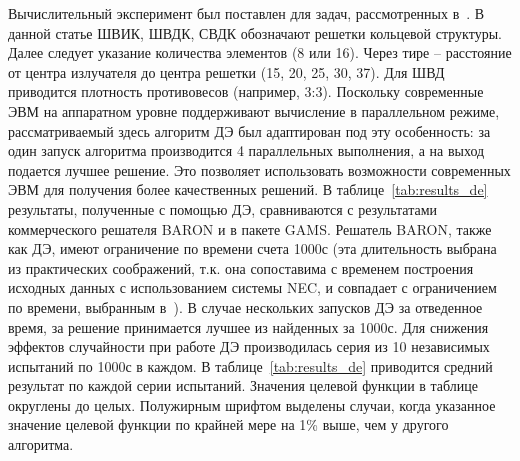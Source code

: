 \documentclass{llncs}
\begin{document}
Вычислительный эксперимент был поставлен для задач, рассмотренных в~\cite{tyunin:daor,tyunin:oniip}. В данной статье ШВИК, ШВДК, СВДК обозначают решетки кольцевой структуры. Далее следует указание количества элементов (8 или 16). Через тире -- расстояние от центра излучателя до центра решетки (15, 20, 25, 30, 37). Для ШВД приводится плотность противовесов (например, 3:3). Поскольку современные ЭВМ на аппаратном уровне поддерживают вычисление в параллельном режиме, рассматриваемый здесь алгоритм ДЭ был адаптирован под эту особенность: за один запуск алгоритма производится 4 параллельных выполнения, а на выход подается лучшее решение. Это позволяет использовать возможности современных ЭВМ для получения более качественных решений. В таблице~\ref{tab:results_de} результаты, полученные с помощью ДЭ, сравниваются с результатами коммерческого решателя BARON и в пакете GAMS. 
Решатель BARON, также как ДЭ, имеют ограничение по времени счета 1000с (эта длительность выбрана из практических соображений, т.к. она сопоставима с временем построения исходных данных с использованием системы NEC, и совпадает с ограничением по времени, выбранным в~\cite{tyunin:daor}). 
В случае нескольких запусков ДЭ за отведенное время, за решение принимается лучшее из найденных за 1000с. Для снижения эффектов случайности при работе ДЭ производилась серия из 10 независимых испытаний по 1000с в каждом. В таблице~\ref{tab:results_de} приводится средний результат по каждой серии испытаний. Значения целевой функции в таблице округлены до целых. Полужирным шрифтом выделены случаи, когда указанное значение целевой функции по крайней мере на 1\% выше, чем у другого алгоритма. 
\end{document}
